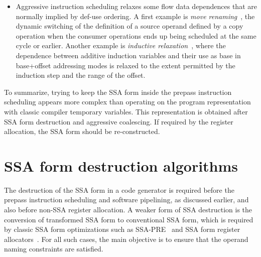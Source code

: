 \begin{itemize}
\item Aggressive instruction scheduling relaxes some flow data dependences that
are normally implied by def-use ordering. A first example is
\emph{move renaming}~\cite{Young:1998:MICRO}, the dynamic switching of the
definition of a source operand defined by a copy operation when the consumer
operations ends up being scheduled at the same cycle or earlier. Another example
is \emph{inductive relaxation}~\cite{Dinechin:1997:PaCT}, where the dependence
between additive induction variables and their use as base in base+offset
addressing modes is relaxed to the extent permitted by the induction step and
the range of the offset.

\end{itemize}

To summarize, trying to keep the SSA form inside the prepass instruction scheduling
appears more complex than operating on the program representation with classic
compiler temporary variables. This representation is obtained after SSA form
destruction and aggressive coalescing. If required by the register allocation,
the SSA form should be re-constructed.


\section{SSA form destruction algorithms} \label{sec:ssa-destruction}


The destruction of the SSA form in a code generator is required before the
prepass instruction scheduling and software pipelining, as discussed earlier,
and also before non-SSA register allocation.  A weaker form of SSA destruction is the conversion of
transformed SSA form to conventional SSA form, which is required by classic SSA
form optimizations such as SSA-PRE~\cite{Kennedy:1999:TOPLAS} and SSA form
register allocators~\cite{Pereira:2008:PLDI}. For all such cases, the main
objective is to ensure that the operand naming constraints are satisfied.

